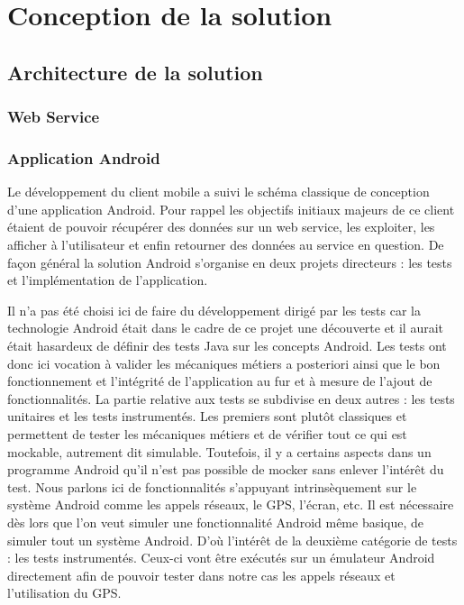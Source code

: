 \section{Conception de la solution}

\subsection{Architecture de la solution}

    \subsubsection{Web Service}

    \subsubsection{Application Android}
Le développement du client mobile a suivi le schéma classique de conception d’une application Android. Pour rappel les objectifs initiaux majeurs de ce client étaient de pouvoir récupérer des données sur un web service, les exploiter, les afficher à l’utilisateur et enfin retourner des données au service en question. De façon général la solution Android s’organise en deux projets directeurs : les tests et l’implémentation de l’application.

Il n’a pas été choisi ici de faire du développement dirigé par les tests car la technologie Android était dans le cadre de ce projet une découverte et il aurait était hasardeux de définir des tests Java sur les concepts Android. Les tests ont donc ici vocation à valider les mécaniques métiers a posteriori ainsi que le bon fonctionnement et l’intégrité de l’application au fur et à mesure de l’ajout de fonctionnalités. La partie relative aux tests se subdivise en deux autres : les tests unitaires et les tests instrumentés. Les premiers sont plutôt classiques et permettent de tester les mécaniques métiers et de vérifier tout ce qui est mockable, autrement dit simulable. Toutefois, il y a certains aspects dans un programme Android qu’il n’est pas possible de mocker sans enlever l’intérêt du test. Nous parlons ici de fonctionnalités s’appuyant intrinsèquement sur le système Android comme les appels réseaux, le GPS, l’écran, etc. Il est nécessaire dès lors que l’on veut simuler une fonctionnalité Android même basique, de simuler tout un système Android. D’où l’intérêt de la deuxième catégorie de tests : les tests instrumentés. Ceux-ci vont être exécutés sur un émulateur Android directement afin de pouvoir tester dans notre cas les appels réseaux et l’utilisation du GPS.


